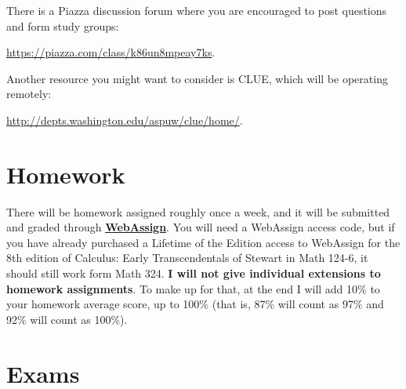 \documentclass[11pt]{article}
\begin{document}
\medskip

\noindent There is a Piazza discussion forum where you are encouraged to post questions and form study groups:
\begin{center}
  \url{https://piazza.com/class/k86un8mpeay7ks}.
\end{center}

\medskip

\noindent Another resource you might want to consider is CLUE, which will be operating remotely:
\begin{center}
 \url{http://depts.washington.edu/aspuw/clue/home/}. 
\end{center}
 
 

\section*{Homework}

There will be homework assigned roughly once a week, and it will be submitted and graded through \href{https://www.webassign.net/washington/login.html}{\textbf{WebAssign}}. You will need a WebAssign access code, but if you have already purchased a Lifetime of the Edition access to WebAssign for the 8th edition of Calculus: Early Transcendentals of Stewart in Math 124-6, it should still work form Math 324. \textbf{I will not give individual extensions to homework assignments}. To make up for that, at the end I will add 10\% to your homework average score, up to 100\% (that is, 87\% will count as 97\% and 92\% will count as 100\%).


\section*{Exams}
\end{document}
